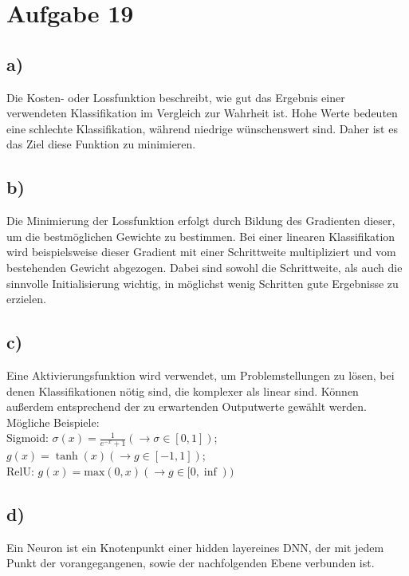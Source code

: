 \section*{Aufgabe 19}
\label{sec:Aufgabe1}
\subsection*{a)}

Die Kosten- oder Lossfunktion beschreibt, wie gut das Ergebnis einer verwendeten Klassifikation im Vergleich zur Wahrheit ist. Hohe Werte bedeuten eine schlechte Klassifikation, während niedrige wünschenswert sind.
Daher ist es das Ziel diese Funktion zu minimieren.

\subsection*{b)}

Die Minimierung der Lossfunktion erfolgt durch Bildung des Gradienten dieser, um die bestmöglichen Gewichte zu bestimmen. Bei einer linearen Klassifikation wird beispielsweise dieser Gradient mit einer Schrittweite multipliziert und vom bestehenden Gewicht abgezogen. Dabei sind sowohl die Schrittweite, als auch die sinnvolle Initialisierung wichtig, in möglichst wenig Schritten gute Ergebnisse zu erzielen.

\subsection*{c)}

Eine Aktivierungsfunktion wird verwendet, um Problemstellungen zu lösen, bei denen Klassifikationen nötig sind, die komplexer als linear sind. Können außerdem entsprechend der zu erwartenden Outputwerte gewählt werden. Mögliche Beispiele:\\
Sigmoid: $\sigma(x) = \frac{1}{e^{-x}+1} (\rightarrow \sigma\in [0,1])$;\\
$g(x) = \tanh(x) (\rightarrow g\in [-1,1])$;\\
RelU: $g(x) = \mathrm{max}(0,x) (\rightarrow g\in [0,\inf))$

\subsection*{d)}
Ein Neuron ist ein Knotenpunkt einer \glqq hidden layer\grqq eines DNN, der mit jedem Punkt der vorangegangenen, sowie der nachfolgenden Ebene verbunden ist.

